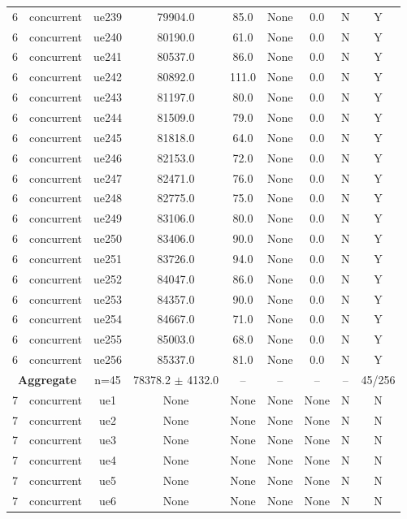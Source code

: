 \begin{table}[ht]
\begin{tabular}{|c|c|c|c|c|c|c|c|c|}
6 & concurrent & ue239 & 79904.0 & 85.0 & None & 0.0 & N & Y \\
6 & concurrent & ue240 & 80190.0 & 61.0 & None & 0.0 & N & Y \\
6 & concurrent & ue241 & 80537.0 & 86.0 & None & 0.0 & N & Y \\
6 & concurrent & ue242 & 80892.0 & 111.0 & None & 0.0 & N & Y \\
6 & concurrent & ue243 & 81197.0 & 80.0 & None & 0.0 & N & Y \\
6 & concurrent & ue244 & 81509.0 & 79.0 & None & 0.0 & N & Y \\
6 & concurrent & ue245 & 81818.0 & 64.0 & None & 0.0 & N & Y \\
6 & concurrent & ue246 & 82153.0 & 72.0 & None & 0.0 & N & Y \\
6 & concurrent & ue247 & 82471.0 & 76.0 & None & 0.0 & N & Y \\
6 & concurrent & ue248 & 82775.0 & 75.0 & None & 0.0 & N & Y \\
6 & concurrent & ue249 & 83106.0 & 80.0 & None & 0.0 & N & Y \\
6 & concurrent & ue250 & 83406.0 & 90.0 & None & 0.0 & N & Y \\
6 & concurrent & ue251 & 83726.0 & 94.0 & None & 0.0 & N & Y \\
6 & concurrent & ue252 & 84047.0 & 86.0 & None & 0.0 & N & Y \\
6 & concurrent & ue253 & 84357.0 & 90.0 & None & 0.0 & N & Y \\
6 & concurrent & ue254 & 84667.0 & 71.0 & None & 0.0 & N & Y \\
6 & concurrent & ue255 & 85003.0 & 68.0 & None & 0.0 & N & Y \\
6 & concurrent & ue256 & 85337.0 & 81.0 & None & 0.0 & N & Y \\
\multicolumn{2}{|c|}{\textbf{Aggregate}} & n=45 & 78378.2 $\pm$ 4132.0 & -- & -- & -- & -- & 45/256 \\
\hline
7 & concurrent & ue1 & None & None & None & None & N & N \\
7 & concurrent & ue2 & None & None & None & None & N & N \\
7 & concurrent & ue3 & None & None & None & None & N & N \\
7 & concurrent & ue4 & None & None & None & None & N & N \\
7 & concurrent & ue5 & None & None & None & None & N & N \\
7 & concurrent & ue6 & None & None & None & None & N & N \\

\end{tabular}
\end{table}
